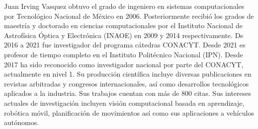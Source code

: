 Juan Irving Vasquez obtuvo el grado de ingeniero en sistemas computacionales por Tecnológico Nacional de México en 2006. Posteriormente recibió los grados de maestría y doctorado en ciencias computacionales por el Instituto Nacional de Astrofísica Óptica y Electrónica (INAOE) en 2009 y 2014 respectivamente. De 2016 a 2021 fue investigador del programa cátedras CONACYT. Desde 2021 es profesor de tiempo completo en el Instituto Politécnico Nacional (IPN). Desde 2017 ha sido reconocido como investigador nacional por parte del CONACYT, actualmente en nivel 1. Su producción científica incluye diversas publicaciones en revistas arbitradas y congresos internacionales, así como desarrollos tecnológicos aplicados a la industria. Sus trabajos cuentan con más de 800 citas. Sus intereses actuales de investigación incluyen visión computacional basada en aprendizaje, robótica móvil, planificación de movimientos así como sus aplicaciones a vehículos autónomos.